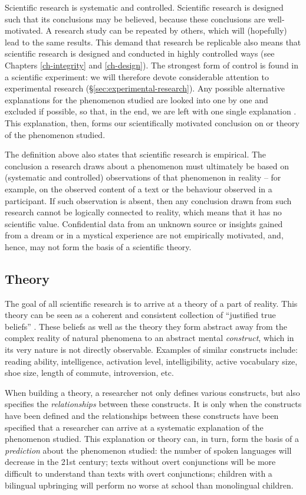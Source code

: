\documentclass[
]{book}
\begin{document}
Scientific research is systematic and controlled. Scientific research is designed such that its conclusions may be believed, because these conclusions are well-motivated. A research study can be repeated by others, which will (hopefully) lead to the same results. This demand that research be replicable also means that scientific research is designed and conducted in highly controlled ways (see Chapters \ref{ch-integrity} and \ref{ch-design}).
The strongest form of control is found in a scientific experiment: we will therefore devote considerable attention to experimental research (§\ref{sec:experimental-research}). Any possible alternative explanations for the phenomenon studied are looked into one by one and excluded if possible, so that, in the end, we are left with one single explanation \citep{KL00}. This explanation, then, forms our scientifically motivated conclusion on or theory of the phenomenon studied.

The definition above also states that scientific research is empirical. The conclusion a research draws about a phenomenon must ultimately be based on (systematic and controlled) observations of that phenomenon in reality -- for example, on the observed content of a text or the behaviour observed in a participant. If such observation is absent, then any conclusion drawn from such research cannot be logically connected to reality, which means that it has no scientific value. Confidential data from an unknown source or insights gained from a dream or in a mystical experience are not empirically motivated, and, hence, may not form the basis of a scientific theory.

\subsection{Theory}\label{sec:theory}

The goal of all scientific research is to arrive at a theory of a part of reality. This theory can be seen as a coherent and consistent collection of ``justified true beliefs'' \citep{Mort03}. These beliefs as well as the theory they form abstract away from the complex reality of natural phenomena to an abstract mental \emph{construct}, which in its very nature is not directly observable. Examples of similar constructs include: reading ability, intelligence, activation level, intelligibility, active vocabulary size, shoe size, length of commute, introversion, etc.

When building a theory, a researcher not only defines various constructs, but also specifies the \emph{relationships} between these constructs. It is only when the constructs have been defined and the relationships between these constructs have been specified that a researcher can arrive at a systematic explanation of the phenomenon studied. This explanation or theory can, in turn, form the basis of a \emph{prediction} about the phenomenon studied: the number of spoken languages will decrease in the 21st century; texts without overt conjunctions will be more difficult to understand than texts with overt conjunctions; children with a bilingual upbringing will perform no worse at school than monolingual children.
\end{document}
